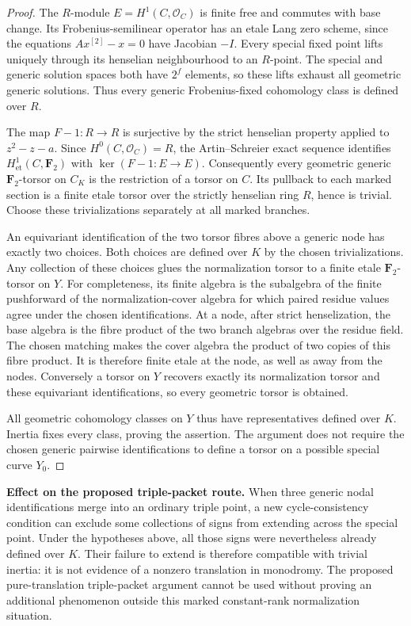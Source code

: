 \begin{proof}
The $R$-module $E=H^1(C,\mathcal O_C)$ is finite free and commutes with
base change. Its Frobenius-semilinear operator has an etale Lang zero
scheme, since the equations $A x^{[2]}-x=0$ have Jacobian $-I$.
Every special fixed point lifts uniquely through its henselian
neighbourhood to an $R$-point. The special and generic solution spaces
both have $2^f$ elements, so these lifts exhaust all geometric generic
solutions. Thus every generic Frobenius-fixed cohomology class is defined
over $R$.

The map $F-1:R\to R$ is surjective by the strict henselian property
applied to $z^2-z-a$. Since $H^0(C,\mathcal O_C)=R$, the Artin--Schreier
exact sequence identifies $H^1_{\mathrm{et}}(C,\mathbf F_2)$ with
$\ker(F-1:E\to E)$. Consequently every geometric generic
$\mathbf F_2$-torsor on $C_K$ is the restriction of a torsor on $C$.
Its pullback to each marked section is a finite etale torsor over the
strictly henselian ring $R$, hence is trivial. Choose these
trivializations separately at all marked branches.

An equivariant identification of the two torsor fibres above a generic
node has exactly two choices. Both choices are defined over $K$ by the
chosen trivializations. Any collection of these choices glues the
normalization torsor to a finite etale $\mathbf F_2$-torsor on $Y$.
For completeness, its finite algebra is the subalgebra of the finite
pushforward of the normalization-cover algebra for which paired residue
values agree under the chosen identifications. At a node, after strict
henselization, the base algebra is the fibre product of the two branch
algebras over the residue field. The chosen matching makes the cover
algebra the product of two copies of this fibre product. It is therefore
finite etale at the node, as well as away from the nodes. Conversely a
torsor on $Y$ recovers exactly its normalization torsor and these
equivariant identifications, so every geometric torsor is obtained.

All geometric cohomology classes on $Y$ thus have representatives defined
over $K$. Inertia fixes every class, proving the assertion. The argument
does not require the chosen generic pairwise identifications to define a
torsor on a possible special curve $Y_0$.

\end{proof}

\par\smallskip\noindent\textbf{Effect on the proposed triple-packet route.}
When three generic nodal identifications merge into an ordinary triple
point, a new cycle-consistency condition can exclude some collections of
signs from extending across the special point. Under the hypotheses
above, all those signs were nevertheless already defined over $K$.
Their failure to extend is therefore compatible with trivial inertia:
it is not evidence of a nonzero translation in monodromy. The proposed
pure-translation triple-packet argument cannot be used without proving
an additional phenomenon outside this marked constant-rank normalization
situation.

